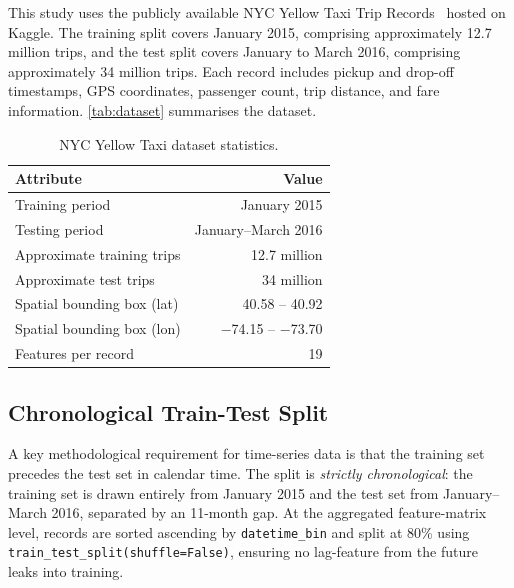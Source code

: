 This study uses the publicly available NYC Yellow Taxi Trip Records~\parencite{taxinyc_dataset} hosted on Kaggle. The training split covers January 2015, comprising approximately 12.7 million trips, and the test split covers January to March 2016, comprising approximately 34 million trips. Each record includes pickup and drop-off timestamps, GPS coordinates, passenger count, trip distance, and fare information. \autoref{tab:dataset} summarises the dataset.

\begin{table}[t]
\centering
\caption{NYC Yellow Taxi dataset statistics.\label{tab:dataset}}
\begin{tabularx}{\textwidth}{>{\raggedright\arraybackslash}X r}
\toprule
\textbf{Attribute} & \textbf{Value} \\
\midrule
Training period & January 2015 \\
Testing period & January--March 2016 \\
Approximate training trips & 12.7 million \\
Approximate test trips & 34 million \\
Spatial bounding box (lat) & 40.58 -- 40.92 \\
Spatial bounding box (lon) & $-$74.15 -- $-$73.70 \\
Features per record & 19 \\
\bottomrule
\end{tabularx}
\end{table}

\subsection{Chronological Train-Test Split}
A key methodological requirement for time-series data is that the training set precedes the test set in calendar time. The split is \emph{strictly chronological}: the training set is drawn entirely from January 2015 and the test set from January--March 2016, separated by an 11-month gap. At the aggregated feature-matrix level, records are sorted ascending by \texttt{datetime\_bin} and split at 80\% using \texttt{train\_test\_split(shuffle=False)}, ensuring no lag-feature from the future leaks into training.

